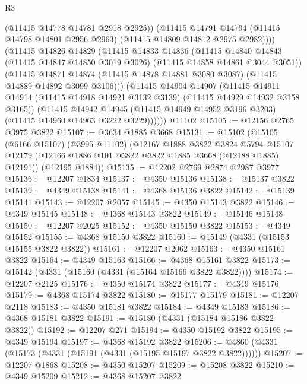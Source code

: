 \begin{lexlean}{R3}
\begin{coremodule}
              (@11415 @14778 @14781 @2918 @2925))
            (@11415
              @14791
              @14794
              (@11415 @14798 @14801 @2956 @2963)
              (@11415 @14809 @14812 @2975 @2982))))
        (@11415
          @14826
          @14829
          (@11415
            @14833
            @14836
            (@11415
              @14840
              @14843
              (@11415 @14847 @14850 @3019 @3026)
              (@11415 @14858 @14861 @3044 @3051))
            (@11415
              @14871
              @14874
              (@11415 @14878 @14881 @3080 @3087)
              (@11415 @14889 @14892 @3099 @3106)))
          (@11415
            @14904
            @14907
            (@11415
              @14911
              @14914
              (@11415 @14918 @14921 @3132 @3139)
              (@11415 @14929 @14932 @3158 @3165))
            (@11415
              @14942
              @14945
              (@11415 @14949 @14952 @3196 @3203)
              (@11415 @14960 @14963 @3222 @3229))))))
    @11102
@15105 := @12156 @2765 @3975 @3822
@15107 := @3634 @1885 @3668
@15131 := @15102
    (@15105
      (@6166 @15107)
      (@3995 @11102)
      (@12167
        @1888
        @3822
        @3824
        @5794
        @15107
        @12179
        (@12166 @1886 @101 @3822 @3822 @1885 @3668 (@12188 @1885) @12191))
      (@12195 @1884))
@15135 := @12202 @2769 @2874 @2987 @3977
@15136 := @12207 @1834
@15137 := @4350 @15136
@15138 := @15137 @3822
@15139 := @4349 @15138
@15141 := @4368 @15136 @3822
@15142 := @15139 @15141
@15143 := @12207 @2057
@15145 := @4350 @15143 @3822
@15146 := @4349 @15145
@15148 := @4368 @15143 @3822
@15149 := @15146 @15148
@15150 := @12207 @2025
@15152 := @4350 @15150 @3822
@15153 := @4349 @15152
@15155 := @4368 @15150 @3822
@15160 := @15149 (@4331 (@15153 @15155 @3822 @3822))
@15161 := @12207 @2062
@15163 := @4350 @15161 @3822
@15164 := @4349 @15163
@15166 := @4368 @15161 @3822
@15173 := @15142 (@4331 (@15160 (@4331 (@15164 @15166 @3822 @3822))))
@15174 := @12207 @2125
@15176 := @4350 @15174 @3822
@15177 := @4349 @15176
@15179 := @4368 @15174 @3822
@15180 := @15177 @15179
@15181 := @12207 @2118
@15183 := @4350 @15181 @3822
@15184 := @4349 @15183
@15186 := @4368 @15181 @3822
@15191 := @15180 (@4331 (@15184 @15186 @3822 @3822))
@15192 := @12207 @271
@15194 := @4350 @15192 @3822
@15195 := @4349 @15194
@15197 := @4368 @15192 @3822
@15206 := @4860 (@4331 (@15173 (@4331 (@15191 (@4331 (@15195 @15197 @3822 @3822))))))
@15207 := @12207 @1868
@15208 := @4350 @15207
@15209 := @15208 @3822
@15210 := @4349 @15209
@15212 := @4368 @15207 @3822

\end{coremodule}
\end{lexlean}
